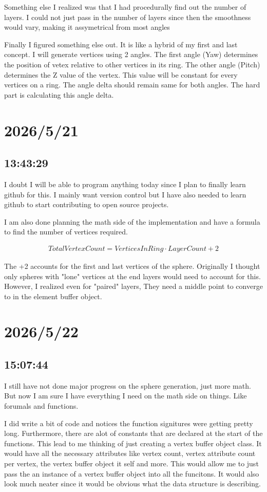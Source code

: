 \documentclass{article}
\begin{document}
Something else I realized was that I had procedurally find out the number of layers. I could not just 
pass in the number of layers since then the smoothness would vary, making it assymetrical from most angles

Finally I figured something else out. It is like a hybrid of my first and last concept. I will generate
vertices using 2 angles. The first angle (Yaw) determines the position of vetex relative to other vertices in
its ring. The other angle (Pitch) determines the Z value of the vertex. This value will be constant for every
vertices on a ring. The angle delta should remain same for both angles. The hard part is calculating this
angle delta.

\section*{2026/5/21}
\subsection*{13:43:29}
I doubt I will be able to program anything today since I plan to finally learn github for this. I mainly
want version control but I have also needed to learn github to start contributing to open source projects.

I am also done planning the math side of the implementation and have a formula to find the number of
vertices required.

\begin{align*}
    TotalVertexCount = VerticesInRing \cdot LayerCount + 2
\end{align*}

The +2 accounts for the first and last vertices of the sphere. Originally I thought only spheres with 
"lone" vertices at the end layers would need to account for this. However, I realized even for "paired"
layers, They need a middle point to converge to in the element buffer object.
\section*{2026/5/22}
\subsection*{15:07:44}
I still have not done major progress on the sphere generation, just more math. But now I am sure 
I have everything I need on the math side on things. Like forumals and functions.

I did write a bit of code and notices the function signitures were getting pretty long. Furthermore,
there are alot of constants that are declared at the start of the functions. This lead to me thinking
of just creating a vertex buffer object class. It would have all the necessary attributes like
vertex count, vertex attribute count per vertex, the vertex buffer object it self and more. This would
allow me to just pass the an instance of a vertex buffer object into all the funcitons. It would also
look much neater since it would be obvious what the data structure is describing.
\end{document}
